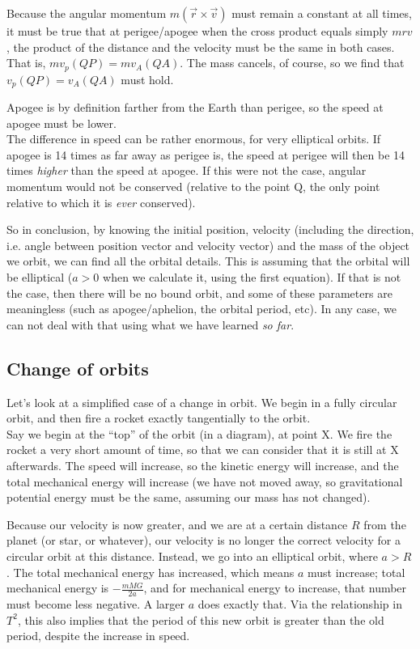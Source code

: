 Because the angular momentum $m(\vec{r} \times \vec{v})$ must remain a constant at all times, it must be true that at perigee/apogee when the cross product equals simply $m r v$, the product of the distance and the velocity must be the same in both cases. That is, $m v_p (QP) = m v_A (QA)$. The mass cancels, of course, so we find that $v_p (QP) = v_A (QA)$ must hold.

Apogee is by definition farther from the Earth than perigee, so the speed at apogee must be lower.\\
The difference in speed can be rather enormous, for very elliptical orbits. If apogee is 14 times as far away as perigee is, the speed at perigee will then be 14 times \emph{higher} than the speed at apogee. If this were not the case, angular momentum would not be conserved (relative to the point Q, the only point relative to which it is \emph{ever} conserved).

So in conclusion, by knowing the initial position, velocity (including the direction, i.e. angle between position vector and velocity vector) and the mass of the object we orbit, we can find all the orbital details. This is assuming that the orbital will be elliptical ($a > 0$ when we calculate it, using the first equation). If that is not the case, then there will be no bound orbit, and some of these parameters are meaningless (such as apogee/aphelion, the orbital period, etc). In any case, we can not deal with that using what we have learned \emph{so far}.

\subsection{Change of orbits}

Let's look at a simplified case of a change in orbit. We begin in a fully circular orbit, and then fire a rocket exactly tangentially to the orbit.\\
Say we begin at the ``top'' of the orbit (in a diagram), at point X. We fire the rocket a very short amount of time, so that we can consider that it is still at X afterwards. The speed will increase, so the kinetic energy will increase, and the total mechanical energy will increase (we have not moved away, so gravitational potential energy must be the same, assuming our mass has not changed).

Because our velocity is now greater, and we are at a certain distance $R$ from the planet (or star, or whatever), our velocity is no longer the correct velocity for a circular orbit at this distance. Instead, we go into an elliptical orbit, where $a > R$. The total mechanical energy has increased, which means $a$ must increase; total mechanical energy is $-\frac{m M G}{2 a}$, and for mechanical energy to increase, that number must become less negative. A larger $a$ does exactly that. Via the relationship in $T^2$, this also implies that the period of this new orbit is greater than the old period, despite the increase in speed.

